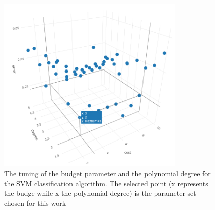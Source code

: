 \documentclass[
12pt, %
a4paper, %
oneside, %
headinclude,footinclude, %
BCOR5mm, %
]{scrartcl}
\begin{document}
\begin{figure}[h]
\begin{center}
\includegraphics[width=0.8\textwidth]{Pic/SVM_tuning.png}
\caption{The tuning of the budget parameter and the polynomial degree for the SVM classification algorithm. The selected point (x represents the budge while x the polynomial degree) is the parameter set chosen for this work}
\label{SVM_tuning}
\end{center}
\end{figure}
\end{document}
